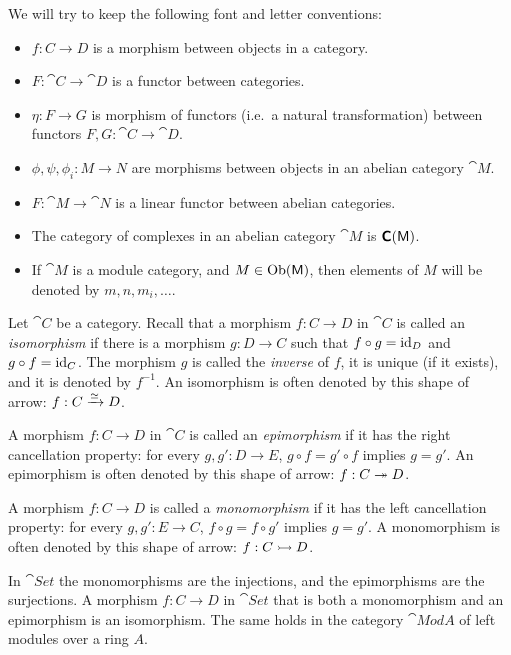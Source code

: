 \begin{conv} \label{conv:3170}
We will try to keep the following font and letter conventions: 
\begin{itemize}
\item $f : C \to D$ is a morphism between objects in a category. 
\item $F : \cat{C} \to \cat{D}$ is a functor between categories. 
\item $\eta : F \to G$ is morphism of functors (i.e.\ a natural transformation) 
between functors $F, G : \cat{C} \to \cat{D}$.
\item $\phi, \psi, \phi_i : M \to N$ are morphisms between objects in an 
abelian category $\cat{M}$. 
\item $F : \cat{M} \to \cat{N}$ is a linear functor between abelian 
categories.
\item The category of complexes in an abelian category $\cat{M}$ is 
$\boldsymbol{\mathsf{C}}(\operatorname{\mathsf{M}})$.
\item If $\cat{M}$ is a module category, and $M \in \operatorname{Ob}(\operatorname{\mathsf{M}})$,
then elements of $M$ will be denoted by $m, n, m_i, \ldots$.
\end{itemize}
\end{conv}




 \label{subsec:zero}
Let $\cat{C}$ be a category. Recall that a morphism $f : C \to D$ in $\cat{C}$ 
is called an {\em isomorphism} if there is a morphism 
$g : D \to C$ such that $f \circ g = \operatorname{id}_D$ and 
$g \circ f = \operatorname{id}_C$. The morphism $g$ is called the {\em inverse} of $f$, 
it is unique (if it exists), and it is denoted by $f^{-1}$. 
An isomorphism is often denoted by this shape of arrow: 
$f : C \xrightarrow{\simeq} D$. 

A morphism $f : C \to D$ in $\cat{C}$ is called an
{\em epimorphism} if it has the right cancellation property: for every
$g, g' : D \to E$, $g \circ f = g' \circ f$ implies $g = g'$. 
An epimorphism is often denoted by this shape of arrow: 
$f : C \twoheadrightarrow D$. 

A morphism $f : C \to D$ is called a {\em monomorphism} if it has the left
cancellation property: for every
$g, g' : E \to C$, $f \circ g = f \circ g'$ implies $g = g'$. 
A monomorphism is often denoted by this shape of arrow: 
$f : C \rightarrowtail D$. 

\begin{exa}
In $\cat{Set}$ the monomorphisms are the injections, and the epimorphisms are
the surjections. A morphism $f : C \to D$ in $\cat{Set}$ that is both a
monomorphism and an epimorphism is an isomorphism. The same holds in the 
category $\cat{Mod} A$ of left modules over a ring $A$. 
\end{exa}

